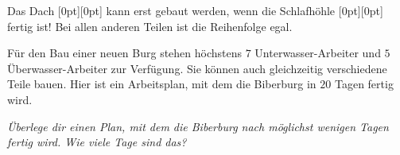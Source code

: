{\begin{adjustwidth}{1.5em}{0em}
\end{adjustwidth}

Das Dach \raisebox{-0.5ex}[0pt][0pt]{} kann erst gebaut werden, wenn die Schlafhöhle \raisebox{-0.5ex}[0pt][0pt]{} fertig ist!  Bei allen anderen Teilen ist die Reihenfolge egal.

Für den Bau einer neuen Burg stehen höchstens $7$ Unterwasser-Arbeiter und $5$ Überwasser-Arbeiter zur Verfügung.
Sie können auch gleichzeitig verschiedene Teile bauen.
Hier ist ein Arbeitsplan, mit dem die Biberburg in $20$ Tagen fertig wird.

{\centering%
\par}



{\em
Überlege dir einen Plan, mit dem die Biberburg nach möglichst wenigen Tagen fertig wird.
Wie viele Tage sind das?


}





}
